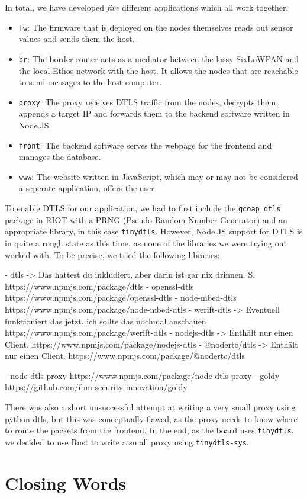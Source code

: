 \documentclass[acmtog, language=english, nonacm]{acmart}
\begin{document}
    In total, we have developed \emph{five} different applications which all work together.
    \begin{itemize}
        \item \texttt{fw}: The firmware that is deployed on the nodes themselves reads out sensor values and sends them the host.
        \item \texttt{br}: The border router acts as a mediator between the lossy SixLoWPAN and the local Ethos network with the host. It allows the nodes that are reachable to send messages to the host computer.
        \item \texttt{proxy}: The proxy receives DTLS traffic from the nodes, decrypts them, appends a target IP and forwards them to the backend software written in Node.JS.
        \item \texttt{front}: The backend software serves the webpage for the frontend and manages the database.
        \item \texttt{www}: The website written in JavaScript, which may or may not be considered a seperate application, offers the user
    \end{itemize}

    To enable DTLS for our application, we had to first include the \texttt{gcoap\_dtls} package in RIOT with a PRNG (Pseudo Random Number Generator) and an appropriate library, in this case \texttt{tinydtls}. However, Node.JS support for DTLS is in quite a rough state as this time, as none of the libraries we were trying out worked with. To be precise, we tried the following libraries:

    - dtls -> Das hattest du inkludiert, aber darin ist gar nix drinnen. S. https://www.npmjs.com/package/dtls
- openssl-dtls https://www.npmjs.com/package/openssl-dtls
- node-mbed-dtls https://www.npmjs.com/package/node-mbed-dtls
- werift-dtls -> Eventuell funktioniert das jetzt, ich sollte das nochmal anschauen https://www.npmjs.com/package/werift-dtls
- nodejs-dtls -> Enthält nur einen Client. https://www.npmjs.com/package/nodejs-dtls
- @nodertc/dtls -> Enthält nur einen Client. https://www.npmjs.com/package/@nodertc/dtls

    - node-dtls-proxy https://www.npmjs.com/package/node-dtls-proxy
- goldy https://github.com/ibm-security-innovation/goldy

    There was also a short unsuccessful attempt at writing a very small proxy using python-dtls, but this was conceptually flawed, as the proxy needs to know where to route the packets from the frontend. In the end, as the board uses \texttt{tinydtls}, we decided to use Rust to write a small proxy using \texttt{tinydtls-sys}.

    \section{Closing Words}

\end{document}
